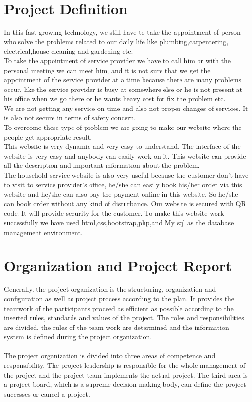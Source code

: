 \documentclass[12pt,a4paper]{report}
\begin{document}
\begin{titlepage}
{\section{ Project Definition }
\vspace{0.5cm}
In this fast growing technology, we still have to take the appointment of person who solve the problems related to our daily life like plumbing,carpentering, electrical,house cleaning and gardening etc.
\\
To take the appointment of service provider we have to call him or with the personal meeting we can meet him, and it is not sure that we get the appointment of the service provider at a time because there are many problems occur, like the service provider is busy at somewhere else or he is not present at his office when we go there or he wants heavy cost for fix the problem etc.\\
We are not getting any service on time and also not proper changes of services. It is also not secure in terms of safety concern.\\
To overcome these type of problem we are going to make our website where the people get appropriate result.\\
This website is very dynamic and very easy to understand. The interface of the website is very easy and anybody can easily work on it. This website can provide all the description and important information about the problem.\\
The household service website is also very useful because the customer don’t have to visit to service provider’s office, he/she can easily book his/her order via this website and he/she can also pay the payment online in this website. So he/she can book order without any kind of disturbance. Our website is secured with QR code. It will provide security for the customer.
To make this website work successfully we have used html,css,bootstrap,php,and My sql as the database management environment.
\vspace{0.5cm}
\section{ Organization and Project Report  }
\vspace{0.5cm}
Generally, the project organization is the structuring, organization and configuration as well as project process according to the plan. It provides the teamwork of the participants proceed as efficient as possible according to the inserted rules, standards and values of the project. The roles and responsibilities are divided, the rules of the team work are determined and the information system is defined during the project organization.\\ \\ The project organization is divided into three areas of competence and responsibility. The project leadership is responsible for the whole management of the project and the project team implements the actual project. The third area is a project board, which is a supreme decision-making body, can define the project successes or cancel a project.
\newpage
}
\end{titlepage}
\end{document}
